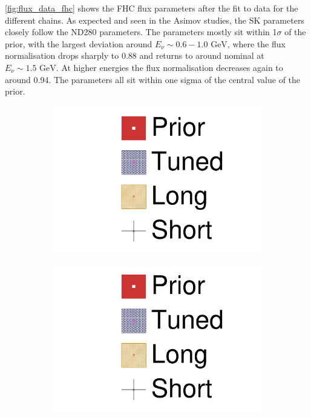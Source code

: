 \autoref{fig:flux_data_fhc} shows the FHC flux parameters after the fit to data for the different chains. As expected and seen in the Asimov studies, the SK parameters closely follow the ND280 parameters. The parameters mostly sit within 1$\sigma$ of the prior, with the largest deviation around $E_\nu \sim 0.6-1.0\text{ GeV}$, where the flux normalisation drops sharply to 0.88 and returns to around nominal at $E_\nu\sim1.5\text{ GeV}$. At higher energies the flux normalisation decreases again to around 0.94. The parameters all sit within one sigma of the central value of the prior.
\begin{figure}[h]
	\begin{subfigure}[t]{0.1\textwidth}
		\includegraphics[width=\textwidth, trim={0mm 150mm 50mm 0mm}, clip,page=1]{figures/mach3/data/2017b_NewData_NewDet_UpdXsecStep_2Xsec_4Det_5Flux_0_2017b_June_NewDet_merge_2017b_NewDet_June_Long_0}
	\end{subfigure}
\begin{subfigure}[t]{0.1\textwidth}
\includegraphics[width=\textwidth, trim={0mm 100mm 50mm 50mm}, clip,page=1]{figures/mach3/data/2017b_NewData_NewDet_UpdXsecStep_2Xsec_4Det_5Flux_0_2017b_June_NewDet_merge_2017b_NewDet_June_Long_0}

\end{subfigure}
\end{figure}
